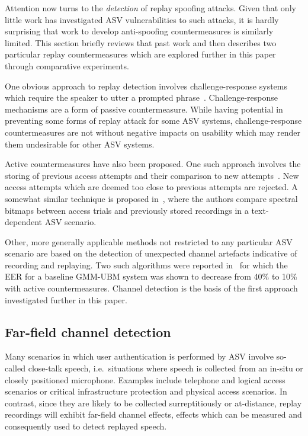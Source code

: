 
Attention now turns to the \emph{detection} of replay spoofing attacks.  Given that only little work has investigated ASV vulnerabilities to such attacks, it is hardly surprising that work to develop anti-spoofing countermeasures is similarly limited.  This section briefly reviews that past work and then describes two particular replay countermeasures which are explored further in this paper through comparative experiments.

One obvious approach to replay detection involves challenge-response systems which require the speaker to utter a prompted phrase~\cite{Petrovska1998}. 
Challenge-response mechanisms are a form of passive countermeasure.
While having potential in preventing some forms of replay attack for some ASV systems, challenge-response countermeasures are not without negative impacts on usability which may render them undesirable for other ASV systems.

Active countermeasures have also been proposed.
One such approach involves the storing of previous access attempts and their comparison to new attempts~\cite{Shang2010}.
New access attempts which are deemed too close to previous attempts are rejected.
A somewhat similar technique is proposed in~\cite{Wu2014}, where the authors compare spectral bitmaps between access trials and previously stored recordings in a text-dependent ASV scenario.

Other, more generally applicable methods not restricted to any particular ASV scenario are based on the detection of unexpected channel artefacts indicative of recording and replaying.
Two such algorithms were reported in~\cite{Wang2011} for which the EER for a baseline GMM-UBM system was shown to decrease from 40\% to 10\% with active countermeasures.  Channel detection is the basis of the first approach investigated further in this paper.



\subsection{Far-field channel detection}

Many scenarios in which user authentication is performed by ASV involve so-called close-talk speech, i.e.\ situations where speech is collected from an in-situ or closely positioned microphone.  Examples include telephone and logical access scenarios or critical infrastructure protection and physical access scenarios.  In contrast, since they are likely to be collected surreptitiously or at-distance, replay recordings will exhibit far-field channel effects, effects which can be measured and consequently used to detect replayed speech.  

